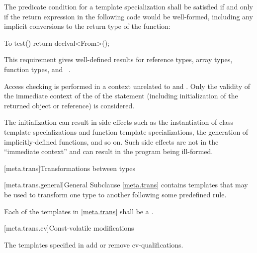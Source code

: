 %
\pnum
The predicate condition for a template specialization 
shall be satisfied if and only if the return expression in the following code would be
well-formed, including any implicit conversions to the return type of the function:

\begin{codeblock}
To test() {
  return declval<From>();
}
\end{codeblock}

\begin{note}
This requirement gives well-defined results for reference types,
array types, function types, and \cv{}~.
\end{note}
Access checking is performed
in a context unrelated to  and . Only the validity of
the immediate context of the  of the  statement
(including initialization of the returned object or reference) is considered.
\begin{note}
The
initialization can result in side effects such as the
instantiation of class template specializations and function template
specializations, the generation of implicitly-defined functions, and so on. Such
side effects are not in the ``immediate context'' and can result in the program
being ill-formed.
\end{note}

[meta.trans]{Transformations between types}

[meta.trans.general]{General}
\pnum
Subclause \ref{meta.trans} contains templates that may be used to transform one
type to another following some predefined rule.

\pnum
Each of the templates in \ref{meta.trans} shall be a
.

[meta.trans.cv]{Const-volatile modifications}

\pnum
The templates specified in 
add or remove cv-qualifications.

